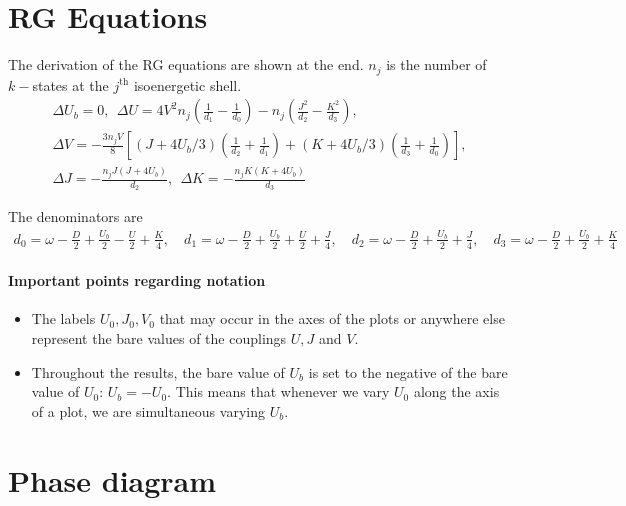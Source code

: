 \documentclass{report}
\numberwithin{equation}{section}
\begin{document}
\section{RG Equations}
The derivation of the RG equations are shown at the end. \(n_j\) is the number of \(k-\)states at the \(j^\text{th}\) isoenergetic shell. 
\begin{gather}
	\Delta U_b = 0, ~ ~\Delta U = 4V^2 n_j\left(\frac{1}{d_1} - \frac{1}{d_0}\right) - n_j\left(\frac{J^2}{d_2} - \frac{K^2}{d_3}\right),\\
	\Delta V = -\frac{3n_j V}{8}\left[\left(J + 4U_b/3\right) \left(\frac{1}{d_2} + \frac{1}{d_1}\right) + \left(K + 4U_b/3\right)\left(\frac{1}{d_3} + \frac{1}{d_0}\right)\right],\\
	\Delta J = -\frac{n_j J\left(J + 4U_b\right)}{d_2},~ ~\Delta K = -\frac{n_j K\left(K + 4U_b\right)}{d_3}
\end{gather}

The denominators are
\begin{equation}\begin{aligned}
	d_0 = \omega - \frac{D}{2} + \frac{U_b}{2} - \frac{U}{2} + \frac{K}{4}, \quad d_1 = \omega - \frac{D}{2} + \frac{U_b}{2} + \frac{U}{2} + \frac{J}{4}, \quad d_2 = \omega - \frac{D}{2} + \frac{U_b}{2} + \frac{J}{4}, \quad d_3 = \omega - \frac{D}{2} + \frac{U_b}{2} + \frac{K}{4}
\end{aligned}\end{equation}

\paragraph{Important points regarding notation}
\begin{itemize}
	\item The labels \(U_0,J_0,V_0\) that may occur in the axes of the plots or anywhere else represent the bare values of the couplings \(U,J\) and \(V\). 
	\item Throughout the results, the bare value of \(U_b\) is set to the negative of the bare value of \(U_0\): \(U_b = -U_0\). This means that whenever we vary \(U_0\) along the axis of a plot, we are simultaneous varying \(U_b\).	
\end{itemize}

\section{Phase diagram}
\end{document}
